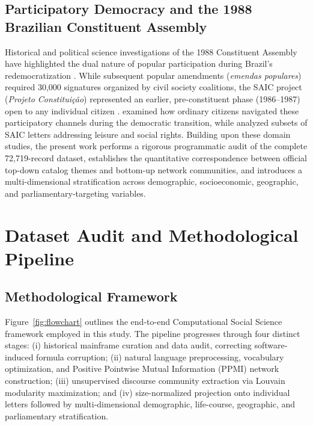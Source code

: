 \documentclass[pdflatex,sn-mathphys,iicol]{sn-jnl}
\begin{document}
\subsection{Participatory Democracy and the 1988 Brazilian Constituent Assembly}
Historical and political science investigations of the 1988 Constituent Assembly have highlighted the dual nature of popular participation during Brazil's redemocratization \citep{souza2008regras,pogrebinschi2014impact,montambeault2018constituicao,mcdonald2022making}. While subsequent popular amendments (\textit{emendas populares}) required 30,000 signatures organized by civil society coalitions, the SAIC project (\textit{Projeto Constitui\c{c}\~{a}o}) represented an earlier, pre-constituent phase (1986--1987) open to any individual citizen \citep{mcdonald2022making,santos2024lazer}. \citet{mcdonald2022making} examined how ordinary citizens navigated these participatory channels during the democratic transition, while \citet{santos2024lazer} analyzed subsets of SAIC letters addressing leisure and social rights. Building upon these domain studies, the present work performs a rigorous programmatic audit of the complete 72,719-record dataset, establishes the quantitative correspondence between official top-down catalog themes and bottom-up network communities, and introduces a multi-dimensional stratification across demographic, socioeconomic, geographic, and parliamentary-targeting variables.

\section{Dataset Audit and Methodological Pipeline}\label{sec3}
\subsection{Methodological Framework}
Figure~\ref{fig:flowchart} outlines the end-to-end Computational Social Science framework employed in this study. The pipeline progresses through four distinct stages: (i) historical mainframe curation and data audit, correcting software-induced formula corruption; (ii) natural language preprocessing, vocabulary optimization, and Positive Pointwise Mutual Information (PPMI) network construction; (iii) unsupervised discourse community extraction via Louvain modularity maximization; and (iv) size-normalized projection onto individual letters followed by multi-dimensional demographic, life-course, geographic, and parliamentary stratification.
\end{document}
